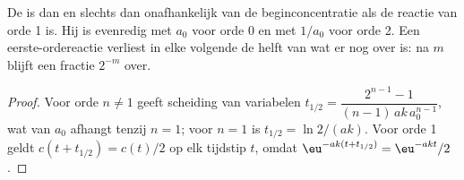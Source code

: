 \begin{proposition}[De halveringstijdtest]\label{prop:b1:rate-laws:half-life-test}
De  is dan en slechts dan onafhankelijk van de
beginconcentratie als de reactie van orde 1 is. Hij is evenredig met
$a_0$ voor orde 0 en met $1/a_0$ voor orde 2. Een eerste-ordereactie
verliest in elke volgende  de helft van wat er nog over
is: na $m$  blijft een fractie $2^{-m}$ over.
\end{proposition}

\begin{proof}
Voor orde $n \ne 1$ geeft scheiding van variabelen $t_{1/2} = \dfrac{2^{n-1} -
1}{(n-1)\,ak\,a_0^{n-1}}$, wat van $a_0$ afhangt tenzij $n = 1$; voor
$n = 1$ is $t_{1/2} = \ln2/(ak)$. Voor orde 1 geldt
$c(t + t_{1/2}) = c(t)/2$ op elk tijdstip $t$, omdat
$\eu^{-ak(t + t_{1/2})} = \eu^{-akt}/2$.
\end{proof}

